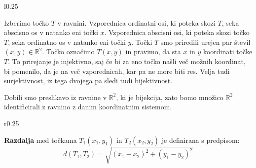 \documentclass[12pt]{article}
\begin{document}
    {
    \begin{wrapfigure}{l}{0.25\textwidth}
    \end{wrapfigure}
    Izberimo točko \(T\) v ravnini. Vzporednica ordinatni osi, ki poteka skozi \(T\), seka abscisno os v natanko eni
    točki \(x\). Vzporednica abscisni osi, ki poteka skozi točko \(T\), seka ordinatno os v natanko eni točki \(y\).
    Točki \(T\) smo priredili urejen par števil \(\left(x, y\right) \in \mathbb{R}^2\). Točko označimo \(T\left(x, y\right)\)
    in pravimo, da sta \(x\) in \(y\) koordinati točke \(T\). To prirejanje je injektivno, saj če bi za eno točko našli
    več možnih koordinat, bi pomenilo, da je na več vzporednicah, kar pa ne more biti res. Velja tudi surjektivnost,
    iz tega dvojega pa sledi tudi bijektivnost.
    }

    Dobili smo preslikavo iz ravnine v \(\mathbb{R}^2\), ki je bijekcija, zato bomo množico \(\mathbb{R}^2\) identificirali
    z ravnino z danim koordinatnim sistemom.

    \begin{wrapfigure}{r}{0.25\textwidth}
    \end{wrapfigure}
    \textbf{Razdalja} med točkama \(T_1\left(x_1, y_1\right)\) in \(T_2\left(x_2, y_2\right)\) je definirana s predpisom:
    \[d\left(T_1, T_2\right) = \sqrt{\left(x_1 - x_2\right) ^ 2 + \left(y_1 - y_2\right)^2}\]
\end{document}
